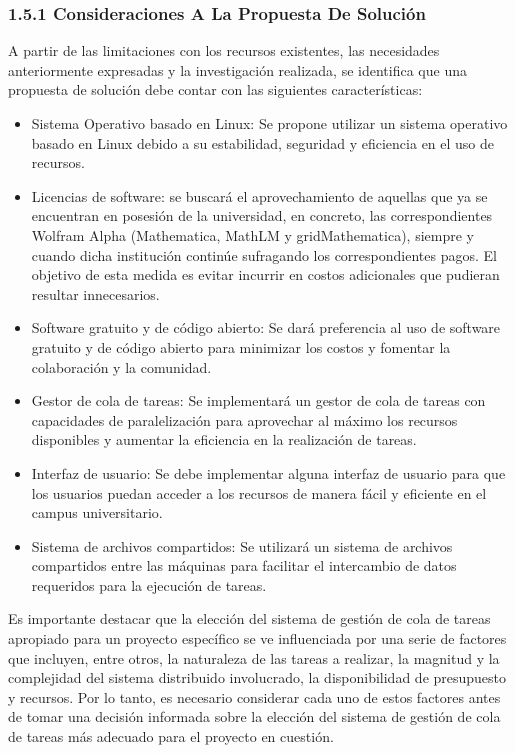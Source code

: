 \begin{spacing}{1.5}
  \subsubsection{1.5.1 Consideraciones A La Propuesta De Solución}
  A partir de las limitaciones con los recursos existentes, las necesidades anteriormente expresadas y la investigación realizada, se identifica que una propuesta de solución debe contar con las siguientes características:
  \begin{itemize}
    \item Sistema Operativo basado en Linux: Se propone utilizar un sistema operativo basado en Linux debido a su estabilidad, seguridad y eficiencia en el uso de recursos.
    \item Licencias de software: se buscará el aprovechamiento de aquellas que ya se encuentran en posesión de la universidad, en concreto, las correspondientes Wolfram Alpha (Mathematica, MathLM y gridMathematica), siempre y cuando dicha institución continúe sufragando los correspondientes pagos. El objetivo de esta medida es evitar incurrir en costos adicionales que pudieran resultar innecesarios.
    \item Software gratuito y de código abierto: Se dará preferencia al uso de software gratuito y de código abierto para minimizar los costos y fomentar la colaboración y la comunidad.
    \item Gestor de cola de tareas: Se implementará un gestor de cola de tareas con capacidades de paralelización para aprovechar al máximo los recursos disponibles y aumentar la eficiencia en la realización de tareas.
    \item Interfaz de usuario: Se debe implementar alguna interfaz de usuario para que los usuarios puedan acceder a los recursos de manera fácil y eficiente en el campus universitario.
    \item Sistema de archivos compartidos: Se utilizará un sistema de archivos compartidos entre las máquinas para facilitar el intercambio de datos requeridos para la ejecución de tareas.
  \end{itemize}
  Es importante destacar que la elección del sistema de gestión de cola de tareas apropiado para un proyecto específico se ve influenciada por una serie de factores que incluyen, entre otros, la naturaleza de las tareas a realizar, la magnitud y la complejidad del sistema distribuido involucrado, la disponibilidad de presupuesto y recursos. Por lo tanto, es necesario considerar cada uno de estos factores antes de tomar una decisión informada sobre la elección del sistema de gestión de cola de tareas más adecuado para el proyecto en cuestión.


\end{spacing}
